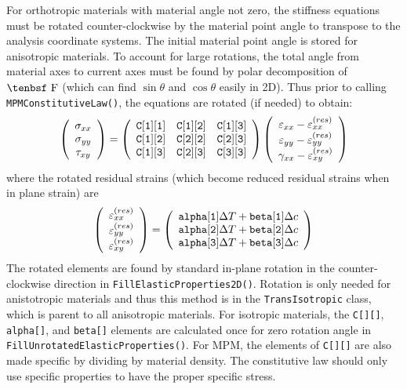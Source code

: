 \documentclass[11pt]{book}
\def\code#1{{\small\tt #1}}
\def\DT{\Delta T}
\def\e#1{\varepsilon_{#1}}
\def\er#1{\varepsilon_{#1}^{(res)}}
\def\F{\hbox{\tenbsf F}}
\def\g#1{\gamma_{#1}}
\def\s#1{\sigma_{#1}}
\def\symmat#1#2#3#4#5#6{\left(\begin{array}{ccc} #1 & #2 & #3 \\ #2 & #4 & #5 \\
                                                      #3 & #5 & #6 \end{array}\right)}
\def\t#1{\tau_{#1}}
\def\vvec#1#2#3{\left(\begin{array}{ccc} #1 \\ #2 \\ #3 \end{array}\right)}
\begin{document}
For orthotropic materials with material angle not zero, the stiffness equations must be rotated counter-clockwise by the material point angle to transpose to the analysis coordinate systems. The initial material point angle is stored for anisotropic materials. To account for large rotations, the total angle from material axes to current axes must be found by polar decomposition of $\F$ (which can find $\sin\theta$ and $\cos\theta$ easily in 2D). Thus prior to calling \code{MPMConstitutiveLaw()}, the equations are rotated (if needed) to obtain:
\begin{equation}
      \vvec{\s{xx}}{\s{yy}}{\t{xy}} = \symmat{\code{C[1][1]}}{\code{C[1][2]}}
                      {\code{C[1][3]}}{\code{C[2][2]}}{\code{C[2][3]}}{\code{C[3][3]}}
          \vvec{\e{xx} - \er{xx}}{\e{yy} - \er{yy}}{\g{xx}-\er{xy}}
 \end{equation}
 where the rotated residual strains (which become reduced residual strains when in plane strain) are
\begin{equation}
\left(\begin{array}{c} \er{xx} \\ \er{yy} \\ \er{xy} \end{array}\right)
       =  \left(\begin{array}{c}
	\code{alpha[1]}\DT + \code{beta[1]}\Delta c \\
	\code{alpha[2]}\DT + \code{beta[2]}\Delta c \\
	\code{alpha[3]}\DT + \code{beta[3]}\Delta c  \end{array}\right)
\end{equation}
 The rotated elements are found by standard in-plane rotation in the counter-clockwise direction in \code{FillElasticProperties2D()}. Rotation is only needed for anistotropic materials and thus this method is in the \code{TransIsotropic} class, which is parent to all anisotropic materials. For isotropic materials, the \code{C[][]}, \code{alpha[]}, and \code{beta[]} elements are calculated once for zero rotation angle in \code{FillUnrotated\-ElasticProperties()}. For MPM, the elements of \code{C[][]} are also made specific by dividing by material density. The constitutive law should only use specific properties to have the proper specific stress.
 
\end{document}
